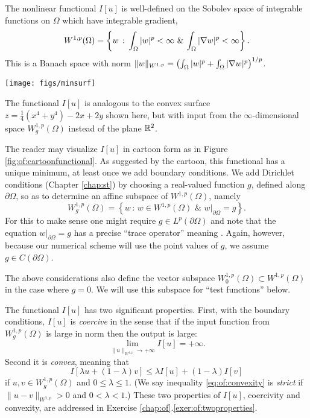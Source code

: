 The nonlinear functional $I[u]$ is well-defined on the Sobolev space \citep{AdamsFournier2003,Evans2010} of integrable functions on $\Omega$ which have integrable gradient,
\begin{equation}
    W^{1,p}(\Omega) = \left\{w \,:\, \int_\Omega |w|^p < \infty \,\, \& \, \int_\Omega |\nabla w|^p < \infty\right\}. \label{eq:of:sobolevdefn}
\end{equation}
This is a Banach space with norm $\|w\|_{W^{1,p}} = \left(\int_\Omega |w|^p + \int_\Omega |\nabla w|^p\right)^{1/p}$.

\begin{marginfigure}
\texttt{[image: figs/minsurf]} %
\medskip
\caption{The functional $I[u]$ is analogous to the convex surface $z = \tfrac{1}{4}(x^4 + y^4) - 2x + 2y$ shown here, but with input from the $\infty$-dimensional space $W_g^{1,p}(\Omega)$ instead of the plane $\mathbb{R}^2$.}
\label{fig:of:cartoonfunctional}
\end{marginfigure}

The reader may visualize $I[u]$ in cartoon form as in Figure \ref{fig:of:cartoonfunctional}.  As suggested by the cartoon, this functional has a unique minimum, at least once we add boundary conditions.  We add Dirichlet conditions (Chapter \ref{chap:st}) by choosing a real-valued function $g$, defined along $\partial \Omega$, so as to determine an affine subspace of $W^{1,p}(\Omega)$, namely
\begin{equation}
    W_g^{1,p}(\Omega) = \left\{w \,:\, w \in W^{1,p}(\Omega) \,\, \& \,\, w\big|_{\partial \Omega} = g\right\}.  \label{eq:of:affinedirichlet}
\end{equation}
For this to make sense one might require $g \in L^p(\partial \Omega)$ and note that the equation $w\big|_{\partial \Omega} = g$ has a precise ``trace operator'' meaning \citep[section 5.5]{Evans2010}.  Again, however, because our numerical scheme will use the point values of $g$, we assume $g\in C(\partial\Omega)$.

The above considerations also define the vector subspace $W_0^{1,p}(\Omega) \subset W^{1,p}(\Omega)$ in the case where $g=0$.  We will use this subspace for ``test functions'' below.

The functional $I[u]$ has two significant properties.  First, with the boundary conditions, $I[u]$ is \emph{coercive} in the sense that if the input function from $W_g^{1,p}(\Omega)$ is large in norm then the output is large:
\begin{equation}
\lim_{\|u\|_{W^{1,p}} \to +\infty} I[u] = +\infty.   \label{eq:of:coercivity}
\end{equation}
Second it is \emph{convex}, meaning that
\begin{equation}
I[\lambda u + (1-\lambda) v] \le \lambda I[u] + (1-\lambda) I[v]    \label{eq:of:convexity}
\end{equation}
if $u,v\in W_g^{1,p}(\Omega)$ and $0 \le \lambda \le 1$.  (We say inequality \eqref{eq:of:convexity} is \emph{strict} if $\|u-v\|_{W^{1,p}} > 0$ and $0 < \lambda < 1$.)
These two properties of $I[u]$, coercivity and convexity, are addressed in Exercise \ref{chap:of}.\ref{exer:of:twoproperties}.

